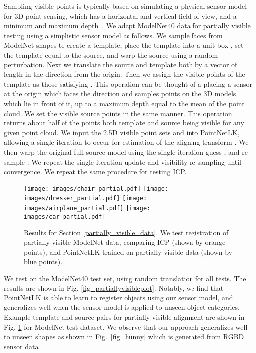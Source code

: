 \documentclass[10pt,twocolumn,letterpaper]{article}
\begin{document}
Sampling visible points is typically based on simulating a physical sensor model for 3D point sensing, which has a horizontal and vertical field-of-view, and a minimum and maximum depth~\cite{mehra2010visibility,eckart2018eoe}. We adapt ModelNet40 data for partially visible testing using a simplistic sensor model as follows. We sample faces from ModelNet shapes to create a template, place the template into a unit box , set the template equal to the source, and warp the source using a random perturbation. Next we translate the source and template both by a vector of length  in the direction  from the origin. Then we assign the visible points of the template  as those satisfying . This operation can be thought of a placing a sensor at the origin which faces the direction  and samples points on the 3D models which lie in front of it, up to a maximum depth equal to the mean of the point cloud. We set the visible source points  in the same manner. This operation returns about half of the points both template and source being visible for any given point cloud. We input the 2.5D visible point sets  and  into PointNetLK, allowing a single iteration to occur for estimation of the aligning transform . We then warp the original full source model  using the single-iteration guess , and re-sample . We repeat the single-iteration update and visibility re-sampling until convergence. We repeat the same procedure for testing ICP.

\begin{figure}[htbp]
\centering
\texttt{[image: images/chair\_partial.pdf]}
\hspace{15mm}
\texttt{[image: images/dresser\_partial.pdf]}
\texttt{[image: images/airplane\_partial.pdf]}
\texttt{[image: images/car\_partial.pdf]}
\caption{Results for Section \ref{partially_visible_data}. We test registration of partially visible ModelNet data, comparing ICP (shown by orange points), and PointNetLK trained on partially visible data (shown by blue points).}
\label{fig_partialregistration}     
\end{figure}

We test on the ModelNet40 test set, using random translation  for all tests. The results are shown in Fig. \ref{fig_partiallyvisibleplot}. Notably, we find that PointNetLK is able to learn to register objects using our sensor model, and generalizes well when the sensor model is applied to unseen object categories. Example template and source pairs for partially visible alignment are shown in Fig. \ref{fig_partialregistration} for ModelNet test dataset. We observe that our approach generalizes well to unseen shapes as shown in Fig.~\ref{fig_bunny} which is generated from RGBD sensor data~\cite{Armeni_2016_CVPR}.
\end{document}
